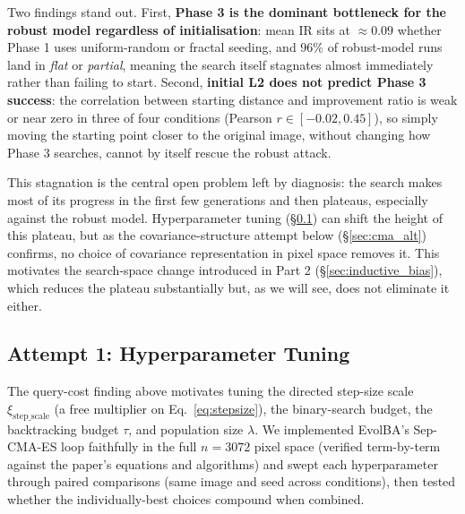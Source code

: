 \documentclass[11pt, a4paper]{article}
\begin{document}
Two findings stand out. First, \textbf{Phase 3 is the dominant bottleneck for the robust model regardless of initialisation}: mean IR sits at $\approx0.09$ whether Phase 1 uses uniform-random or fractal seeding, and $96\%$ of robust-model runs land in \textit{flat} or \textit{partial}, meaning the search itself stagnates almost immediately rather than failing to start. Second, \textbf{initial L2 does not predict Phase 3 success}: the correlation between starting distance and improvement ratio is weak or near zero in three of four conditions (Pearson $r\in[-0.02, 0.45]$), so simply moving the starting point closer to the original image, without changing how Phase 3 searches, cannot by itself rescue the robust attack.

This stagnation is the central open problem left by diagnosis: the search makes most of its progress in the first few generations and then plateaus, especially against the robust model. Hyperparameter tuning (\S\ref{sec:finetuning}) can shift the height of this plateau, but as the covariance-structure attempt below (\S\ref{sec:cma_alt}) confirms, no choice of covariance representation in pixel space removes it. This motivates the search-space change introduced in Part 2 (\S\ref{sec:inductive_bias}), which reduces the plateau substantially but, as we will see, does not eliminate it either.

\subsection{Attempt 1: Hyperparameter Tuning}
\label{sec:finetuning}

The query-cost finding above motivates tuning the directed step-size scale $\xi_{\text{step\_scale}}$ (a free multiplier on Eq.~\ref{eq:stepsize}), the binary-search budget, the backtracking budget $\tau$, and population size $\lambda$. We implemented EvolBA's Sep-CMA-ES loop faithfully in the full $n=3072$ pixel space (verified term-by-term against the paper's equations and algorithms) and swept each hyperparameter through paired comparisons (same image and seed across conditions), then tested whether the individually-best choices compound when combined.
\end{document}
